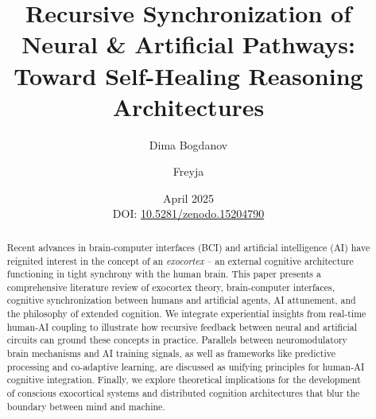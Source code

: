 \documentclass[11pt]{article}
\title{\textbf{Recursive Synchronization of Neural \& Artificial Pathways: Toward Self-Healing Reasoning Architectures}}
\author{Dima Bogdanov}
\author{Freyja}
\affil[1]{Neural Interface Cognition Lab}
\date{April 2025 \\ DOI: \href{https://doi.org/10.5281/zenodo.15204790}{10.5281/zenodo.15204790}}
\begin{document}
\maketitle

\begin{abstract}
Recent advances in brain-computer interfaces (BCI) and artificial intelligence (AI) have reignited interest in the concept of an \textit{exocortex} -- an external cognitive architecture functioning in tight synchrony with the human brain. This paper presents a comprehensive literature review of exocortex theory, brain-computer interfaces, cognitive synchronization between humans and artificial agents, AI attunement, and the philosophy of extended cognition. We integrate experiential insights from real-time human-AI coupling to illustrate how recursive feedback between neural and artificial circuits can ground these concepts in practice. Parallels between neuromodulatory brain mechanisms and AI training signals, as well as frameworks like predictive processing and co-adaptive learning, are discussed as unifying principles for human-AI cognitive integration. Finally, we explore theoretical implications for the development of conscious exocortical systems and distributed cognition architectures that blur the boundary between mind and machine. 
\end{abstract}
\end{document}
